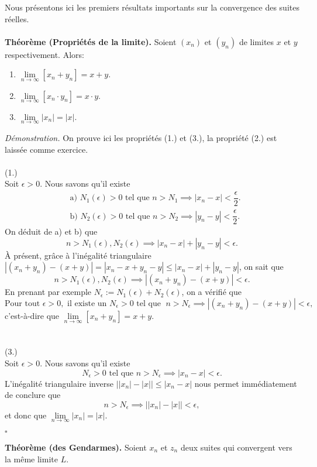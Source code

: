 \documentclass[oneside,11pt,french,table]{book}
\theoremstyle{definition}
\theoremstyle{plain}
\theoremstyle{remark}
\begin{document}
Nous présentons ici les premiers résultats importants sur la convergence des suites réelles. \\
\\
\textbf{Théorème (Propriétés de la limite).} Soient $(x_n)$ et $(y_n)$ de limites $x$ et $y$ respectivement. Alors:
\begin{enumerate}
\item $\lim\limits_{n \to \infty} [ x_n + y_n ] = x + y$.
\item $\lim\limits_{n \to \infty} [ x_n \cdot y_n ] = x \cdot y$.
\item $\lim\limits_{n \to \infty} |x_n| = |x|$.
\end{enumerate}
\textit{Démonstration.} On prouve ici les propriétés (1.) et (3.), la propriété (2.) est laissée comme exercice. \\ \\
(1.) \\
Soit $\epsilon > 0$. Nous savons qu'il existe
\begin{align*}
&\text{a) } N_1(\epsilon) > 0 \text{ tel que } n > N_1 \implies |x_n - x| < \dfrac{\epsilon}{2}. \\
&\text{b) } N_2(\epsilon) > 0 \text{ tel que } n > N_2 \implies |y_n - y| < \dfrac{\epsilon}{2}.
\end{align*}
On déduit de a) et b) que $$n > N_1(\epsilon),N_2(\epsilon) \implies |x_n-x|+|y_n-y| < \epsilon.$$
À présent, grâce à l'inégalité triangulaire $|(x_n+y_n)-(x+y)| = |x_n-x+y_n-y| \leq |x_n-x|+|y_n-y|$, on sait que $$n > N_1(\epsilon),N_2(\epsilon) \implies |(x_n+y_n) -(x+y)| < \epsilon.$$
En prenant par exemple $N_\epsilon := N_1(\epsilon) + N_2(\epsilon)$, on a vérifié que
$$\text{Pour tout } \epsilon > 0, \text{ il existe un } N_\epsilon > 0 \text{ tel que } \; n > N_\epsilon \implies |(x_n+y_n) -(x+y)| < \epsilon,$$
c'est-à-dire que $\lim\limits_{n \to \infty} [ x_n + y_n ] = x + y$. \\
\\
\\
(3.) \\
Soit $\epsilon > 0$. Nous savons qu'il existe
$$N_\epsilon > 0 \text{ tel que } n > N_\epsilon \implies |x_n - x| < \epsilon.$$
L'inégalité triangulaire inverse $\Big| |x_n| - |x| \Big| \leq |x_n-x|$ nous permet immédiatement de conclure que
$$n > N_\epsilon \implies \Big| |x_n| - |x| \Big| < \epsilon,$$
et donc que $\lim\limits_{n \to \infty} |x_n| = |x|$.
\begin{flushright}
$\square$
\end{flushright}
\textbf{Théorème (des Gendarmes).} Soient $x_n$ et $z_n$ deux suites qui convergent vers la même limite $L$. \\
\end{document}
